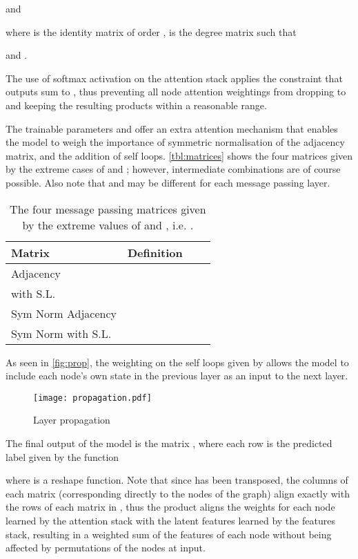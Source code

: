 \documentclass{article}
\theoremstyle{definition}
\begin{document}
and

where  is the identity matrix of order ,  is the degree matrix such that

and .

The use of softmax activation on the attention stack applies the constraint that outputs sum to , thus preventing all node attention weightings from dropping to  and keeping the resulting products within a reasonable range.

The trainable parameters  and  offer an extra attention mechanism that enables the model to weigh the importance of symmetric normalisation of the adjacency matrix, and the addition of self loops. \autoref{tbl:matrices} shows the four matrices given by the extreme cases of  and ; however, intermediate combinations are of course possible. Also note that  and  may be different for each message passing layer.

\begin{table}[h!]
  \small
  \begin{tabularx}{\linewidth}{lXcc}
    \toprule
    Matrix & Definition &  &  \\
    \midrule
    Adjacency &  &  &  \\
     with S.L. &  &  &  \\
    Sym Norm Adjacency &  &  &  \\
    Sym Norm  with S.L. &  &  &  \\
    \bottomrule
  \end{tabularx}
  \caption{The four message passing matrices given by the extreme values of  and , i.e. .}
  \label{tbl:matrices}
\end{table}

As seen in \autoref{fig:prop}, the weighting on the self loops given by  allows the model to include each node's own state in the previous layer as an input to the next layer.

\begin{figure}[htb]
  \centering
  \texttt{[image: propagation.pdf]}
  \caption{Layer propagation}
  \label{fig:prop}
\end{figure}

The final output of the model is the matrix , where each row  is the predicted label given by the function
\small

\normalsize
where \small\normalsize is a reshape function. Note that since  has been transposed, the columns of each matrix (corresponding directly to the nodes of the graph) align exactly with the rows of each matrix in , thus  the product \small\normalsize aligns the weights for each node learned by the attention stack with the latent features learned by the features stack, resulting in a weighted sum of the features of each node without being affected by permutations of the nodes at input.
\end{document}
